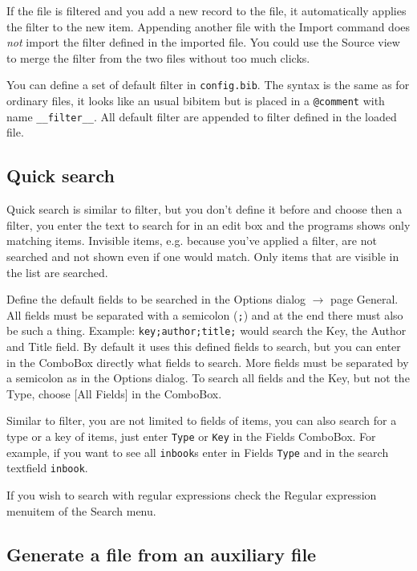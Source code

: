 \documentclass[oneside,10pt]{article}
\newcommand{\command}[1]{\textsf{#1}}
\begin{document}
If the file is filtered and you add a new record to the file, it automatically
applies the filter to the new item. Appending another file with the Import command
does \emph{not} import the filter defined in the imported file. You could use the Source
view to merge the filter from the two files without too much clicks.

You can define a set of default filter in \verb|config.bib|. The syntax is the same
as for ordinary \BibTeX{} files, it looks like an usual bibitem but is placed
in a \verb|@comment| with name \verb|__filter__|. All default filter are appended
to filter defined in the loaded file.

\subsection{Quick search}
\label{sec:Quicksearch}

Quick search is similar to filter, but you don't define it before
and choose then a filter, you enter the text to search for in an edit box and the
programs shows only matching items. Invisible items, e.g. because you've applied
a filter, are not searched and not shown even if one would match. Only items that
are visible in the list are searched.

Define the default fields to be searched in the Options
dialog $\rightarrow$ page General. All fields
must be separated with a semicolon (\verb|;|) and at the end there must also be such a
thing. Example: \verb|key;author;title;| would search the Key, the Author and Title field.
By default it uses this defined fields to search, but you can enter in the ComboBox
directly what fields to search. More fields must be separated by a semicolon as
in the Options dialog. To search all fields and the Key, but not the Type, choose
\command{[All Fields]} in the ComboBox.

Similar to filter, you are not limited to fields of items, you can also search
for a type or a key of items, just enter \verb|Type| or \verb|Key| in the Fields ComboBox.
For example, if you want to see all \verb|inbook|s enter in Fields \verb|Type| and
in the search textfield \verb|inbook|.

If you wish to search with regular expressions check the Regular expression menuitem
of the Search menu.

\subsection{Generate a \BibTeX{} file from an auxiliary file}
\label{sec:GenFromAux}
\end{document}
